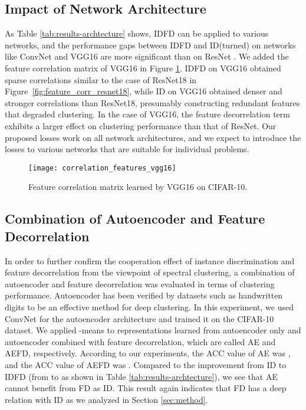 \documentclass{article} \usepackage{iclr2021_conference,times}
\begin{document}
\subsection{Impact of Network Architecture}
As Table \ref{tab:results-archtecture} shows, IDFD can be applied to various networks, and the performance gaps between IDFD and ID(turned) on networks like ConvNet \cite{DCCM} and VGG16 \cite{VGG16} are more significant than on ResNet \cite{He2015}. 
We added the feature correlation matrix of VGG16 in Figure \ref{fig:feature_corr_vgg16}.
IDFD on VGG16 obtained sparse correlations similar to the case of ResNet18 in Figure~\ref{fig:feature_corr_resnet18}, while ID on VGG16 obtained denser and stronger correlations than ResNet18, presumably constructing redundant features that degraded clustering.
In the case of VGG16, the feature decorrelation term  exhibits a larger effect on clustering performance than that of ResNet.
Our proposed losses work on all network architectures, and we expect to introduce the losses to various networks that are suitable for individual problems. 

\begin{figure}[h]
  \centering
  \texttt{[image: correlation\_features\_vgg16]}
  \caption{Feature correlation matrix learned by VGG16 on CIFAR-10.}
\label{fig:feature_corr_vgg16}
\end{figure}

\subsection{Combination of Autoencoder and Feature Decorrelation}
In order to further confirm the cooperation effect of instance discrimination and feature decorrelation from the viewpoint of spectral clustering, a combination of autoencoder and feature decorrelation was evaluated in terms of clustering performance. Autoencoder has been verified by datasets such as handwritten digits to be an effective method for deep clustering. In this experiment, we used ConvNet \cite{DCCM} for the autoencoder architecture and trained it on the CIFAR-10 dataset. We applied -means to representations learned from autoencoder only and autoencoder combined with feature decorrelation, which are called AE and AEFD, respectively. According to our experiments, the ACC value of AE was , and the ACC value of AEFD was . Compared to the improvement from ID to IDFD (from  to  as shown in Table \ref{tab:results-archtecture}), we see that AE cannot benefit from FD as ID. This result again indicates that FD has a deep relation with ID as we analyzed in Section \ref{sec:method}.
\end{document}

